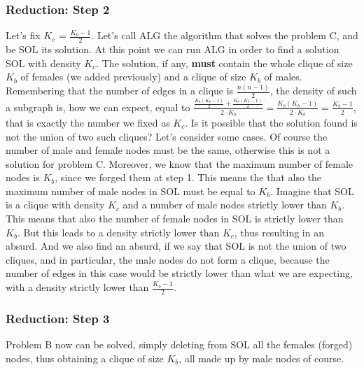 \subsubsection{Reduction: Step 2}
Let's fix $K_c$ = $\frac{K_b-1}{2}$. Let's call ALG the algorithm that solves the problem C, and be SOL its solution.
At this point we can run ALG in order to find a solution SOL with density $K_c$. The solution, if any, \textbf{must} contain the whole clique of size $K_b$ of females (we added previously) and a clique of size $K_b$ of males. Remembering that the number of edges in a clique is $\frac{n(n-1)}{2}$, the density of such a subgraph is, how we can expect, equal to $\frac{\frac{K_b(K_b - 1)}{2} + \frac{K_b(K_b - 1)}{2}}{2 \cdot K_b}  = \frac{K_b(K_b - 1)}{2 \cdot K_b} = \frac{K_b - 1}{2}$, that is exactly the number we fixed as $K_c$.
\newline
Is it possible that the solution found is not the union of two such cliques? Let's consider some cases.
Of course the number of male and female nodes must be the same, otherwise this is not a solution for problem C. Moreover, we know that the maximum number of female nodes is $K_b$, since we forged them at step 1. This means the that also the maximum number of male nodes in SOL must be equal to $K_b$.
Imagine that SOL is a clique with density $K_c$ and a number of male nodes strictly lower than $K_b$. This means that also the number of female nodes in SOL is strictly lower than $K_b$. But this leads to a density strictly lower than $K_c$, thus resulting in an absurd. And we also find an absurd, if we say that SOL is not the union of two cliques, and in particular, the male nodes do not form a clique, because the number of edges in this case would be strictly lower than what we are expecting, with a density strictly lower than $\frac{K_b -1}{2}$.
\subsubsection{Reduction: Step 3}
Problem B now can be solved, simply deleting from SOL all the females (forged) nodes, thus obtaining a clique of size $K_b$, all made up by male nodes of course.

